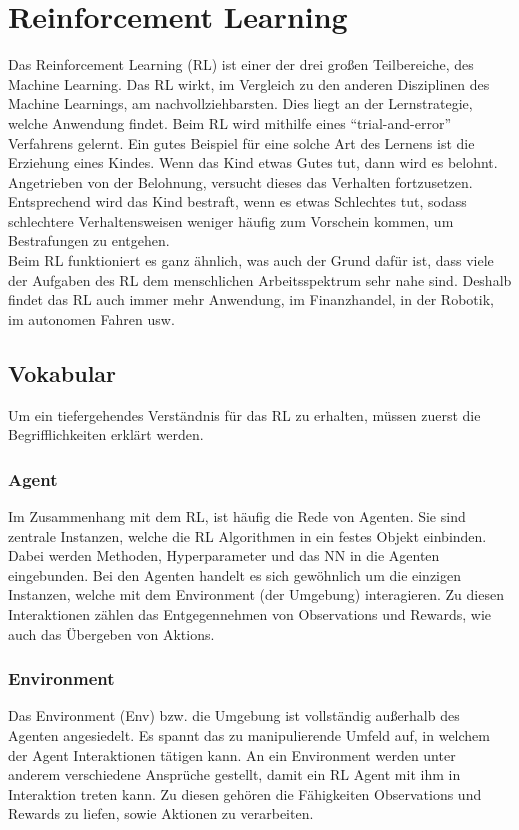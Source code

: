 \section{Reinforcement Learning} \label{sec:Grundlagen_RL}
Das Reinforcement Learning (RL) ist einer der drei großen Teilbereiche, des Machine Learning.
Das RL wirkt, im Vergleich zu den anderen Disziplinen des Machine Learnings, am nachvollziehbarsten.
Dies liegt an der Lernstrategie, welche Anwendung findet. 
Beim RL wird mithilfe eines "`trial-and-error"' Verfahrens gelernt. Ein gutes Beispiel für eine solche Art des Lernens ist die Erziehung eines Kindes. Wenn das Kind etwas Gutes tut, dann wird es belohnt. Angetrieben von der Belohnung, versucht dieses das Verhalten fortzusetzen. 
Entsprechend wird das Kind bestraft, wenn es etwas Schlechtes tut, sodass schlechtere Verhaltensweisen weniger häufig zum Vorschein kommen, um Bestrafungen zu entgehen. \citep[S.1 ff.]{Sutton1998}\\
Beim RL funktioniert es ganz ähnlich, was auch der Grund dafür ist, dass viele der Aufgaben des RL dem menschlichen Arbeitsspektrum sehr nahe sind. 
Deshalb findet das RL auch immer mehr Anwendung, im Finanzhandel, in der Robotik, im autonomen Fahren usw. \citep[Kapitel 18]{DRL_Lapan}

\subsection{Vokabular} \label{subsec:Grundlagen_Vokabular}
Um ein tiefergehendes Verständnis für das RL zu erhalten, müssen zuerst die Begrifflichkeiten erklärt werden.

\subsubsection{Agent} \label{subsubsec:Grundlagen_Agent}
Im Zusammenhang mit dem RL, ist häufig die Rede von Agenten. Sie sind zentrale Instanzen, welche die RL Algorithmen in ein festes Objekt einbinden. Dabei werden Methoden, Hyperparameter und das NN in die Agenten eingebunden. \citep[S. 31]{DRL_Lapan}
Bei den Agenten handelt es sich gewöhnlich um die einzigen Instanzen, welche mit dem Environment (der Umgebung) interagieren. Zu diesen Interaktionen zählen das Entgegennehmen von Observations und Rewards, wie auch das Übergeben von Aktions. \citep[S. 2ff.]{Sutton1998}

\subsubsection{Environment} \label{subsubsec:Grundlagen_Environment}
Das Environment (Env) bzw. die  Umgebung ist vollständig außerhalb des Agenten angesiedelt. Es spannt das zu manipulierende Umfeld auf, in welchem der Agent Interaktionen tätigen kann. An ein Environment werden unter anderem verschiedene Ansprüche gestellt, damit ein RL Agent mit ihm in Interaktion treten kann. Zu diesen gehören die Fähigkeiten Observations und Rewards zu liefen, sowie Aktionen zu verarbeiten. \citep[S. 31 \& S.2 ff.]{DRL_Lapan, Sutton1998}

